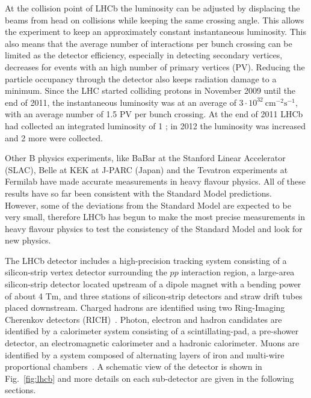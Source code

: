 At the collision point of LHCb the luminosity can be adjusted by displacing the beams from head on collisions
while keeping the same crossing angle. This allows the experiment to keep an approximately constant instantaneous
luminosity. This also means that the average number of interactions per bunch crossing can be limited as the detector
efficiency, especially in detecting secondary vertices, decreases for events with an high number of primary vertices (PV).
Reducing the particle occupancy through the detector also keeps radiation damage to a minimum. Since the LHC started colliding
protons in November 2009 until the end of 2011, the instantaneous luminosity was at an average of
$3 \cdot 10^{32}~\mbox{cm}^{-2}\mbox{s}^{-1}$, with an average number of 1.5 PV per bunch crossing.
At the end of 2011 LHCb had collected an integrated luminosity of 1 \invfb; in 2012 the luminosity was increased
and 2 \invfb more were collected.

Other B physics experiments, like BaBar at the Stanford Linear Accelerator (SLAC), Belle at KEK at J-PARC (Japan)
and the Tevatron experiments at Fermilab have made accurate measurements in heavy flavour physics. All of these
results have so far been consistent with the Standard Model predictions. However, some of the deviations from the
Standard Model are expected to be very small, therefore LHCb has begun to make the most precise measurements
in heavy flavour physics to test the consistency of the Standard Model and look for new physics.

The LHCb detector includes a high-precision tracking system consisting of a silicon-strip
vertex detector surrounding the $pp$ interaction region, a large-area silicon-strip detector located upstream
of a dipole magnet with a bending power of about 4 Tm, and three stations of silicon-strip detectors and straw
drift tubes placed downstream. 
Charged hadrons are identified using two
Ring-Imaging Cherenkov detectors (RICH)~\cite{LHCb-DP-2012-003}. Photon, electron and hadron candidates are
identified by a calorimeter system consisting of a scintillating-pad, a pre-shower detector, an electromagnetic
calorimeter and a hadronic calorimeter. Muons are identified by a system composed of alternating layers of iron
and multi-wire proportional chambers~\cite{LHCb-DP-2012-002}. A schematic view of the detector is shown in Fig.~\ref{fig:lhcb}
and more details on each sub-detector are given in the following sections.


